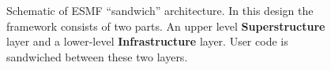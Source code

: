 \begin{center}
\begin{figure}
\caption{Schematic of ESMF ``sandwich'' architecture. In this design the framework consists of two parts. An upper level
{\bf Superstructure} layer and a lower-level {\bf Infrastructure} layer. User code is sandwiched between these two layers.}
\label{fig:TheESMFwich}
\end{figure}
\end{center}
















